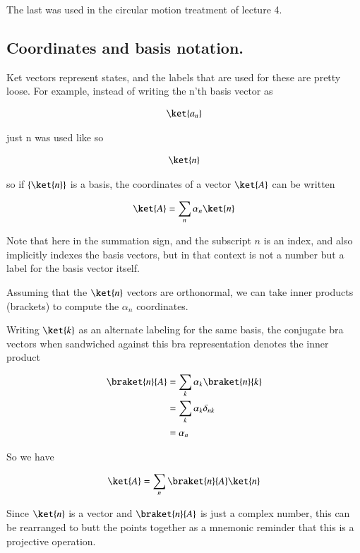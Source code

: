 The last was used in the circular motion treatment of lecture 4. 

\subsection{Coordinates and basis notation. }

Ket vectors represent states, and the labels that are used for these are pretty loose.  For example, instead
of writing the n'th basis vector as 

\begin{align*}
\ket{a_n}
\end{align*}

just n was used like so

\begin{align*}
\ket{n}
\end{align*}

so if $\{\ket{n}\}$ is a basis, the coordinates of a vector $\ket{A}$ can be written

\begin{align*}
\ket{A} = \sum_n \alpha_n \ket{n}
\end{align*}

Note that here in the summation sign, and the subscript $n$ is an index, and also implicitly indexes the basis vectors, but in that context is not a number but a label for the basis vector itself.

Assuming that the $\ket{n}$ vectors are orthonormal, we can take inner products (brackets) to compute the $\alpha_n$ coordinates.

Writing $\ket{k}$ as an alternate labeling for the same basis, the conjugate bra vectors when sandwiched against this bra representation denotes the inner product

\begin{align*}
\braket{n}{A} 
&= \sum_k \alpha_k \braket{n}{k} \\
&= \sum_k \alpha_k \delta_{nk} \\
&= \alpha_n \\
\end{align*}

So we have

\begin{align*}
\ket{A} = \sum_n \braket{n}{A} \ket{n}
\end{align*}

Since $\ket{n}$ is a vector and $\braket{n}{A}$ is just a complex number, this can be rearranged to butt the points
together as a mnemonic reminder that this is a projective operation.

